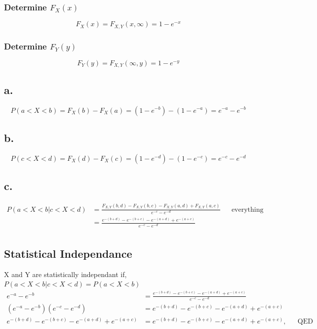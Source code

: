 \documentclass[12pt]{article}
\begin{document}
\subsubsection*{Determine $F_X(x)$}
\[F_X(x) = F_{X,Y}(x,\infty) = 1-e^{-x}\]

\subsubsection*{Determine $F_Y(y)$}
\[F_Y(y) = F_{X,Y}(\infty,y) = 1-e^{-y}\]

\subsection*{a.}
\[P(a<X<b) = F_X(b) - F_X(a) = (1-e^{-b})-(1-e^{-a}) = e^{-a}-e^{-b}\]

\subsection*{b.}
\[P(c<X<d) = F_X(d) - F_X(c) = (1-e^{-d})-(1-e^{-c}) = e^{-c}-e^{-d}\]

\subsection*{c.}
\begin{align*}
  P(a<X<b|c<X<d) &= \frac{F_{X,Y}(b,d)-F_{X,Y}(b,c) - F_{X,Y}(a,d) + F_{X,Y}(a,c)}
    {e^{-c}-e^{-d}} & & \textrm{everything cancels except} \\
    &= \frac{e^{-(b+d)}-e^{-(b+c)}-e^{-(a+d)}+e^{-(a+c)}}{e^{-c}-e^{-d}} \\
\end{align*}

\subsection*{Statistical Independance}
X and Y are statistically independant if, $P(a<X<b|c<X<d) = P(a<X<b)$ \\
\begin{align*}
e^{-a}-e^{-b} &= \frac{e^{-(b+d)}-e^{-(b+c)}-e^{-(a+d)}+e^{-(a+c)}}{e^{-c}-e^{-d}} \\
(e^{-a}-e^{-b})(e^{-c}-e^{-d}) &= e^{-(b+d)}-e^{-(b+c)}-e^{-(a+d)}+e^{-(a+c)} \\
e^{-(b+d)}-e^{-(b+c)}-e^{-(a+d)}+e^{-(a+c)} &= e^{-(b+d)}-e^{-(b+c)}-e^{-(a+d)}+e^{-(a+c)}, & & \textrm{QED} \\
\end{align*}
\end{document}
